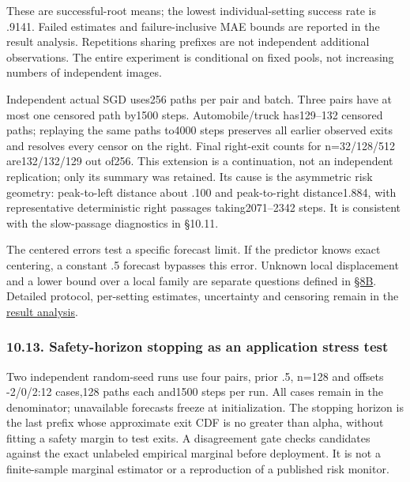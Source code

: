 These are successful-root means; the lowest individual-setting success
rate is .9141. Failed estimates and failure-inclusive MAE bounds are
reported in the result analysis. Repetitions sharing prefixes are not
independent additional observations. The entire experiment is
conditional on fixed pools, not increasing numbers of independent
images.

Independent actual SGD uses256 paths per pair and batch. Three pairs
have at most one censored path by1500 steps. Automobile/truck
has129--132 censored paths; replaying the same paths to4000 steps
preserves all earlier observed exits and resolves every censor on the
right. Final right-exit counts for n=32/128/512 are132/132/129 out
of256. This extension is a continuation, not an independent replication;
only its summary was retained. Its cause is the asymmetric risk
geometry: peak-to-left distance about .100 and peak-to-right
distance1.884, with representative deterministic right passages
taking2071--2342 steps. It is consistent with the slow-passage
diagnostics in §10.11.

The centered errors test a specific forecast limit. If the predictor
knows exact centering, a constant .5 forecast bypasses this error.
Unknown local displacement and a lower bound over a local family are
separate questions defined in \href{local_prediction.md}{§8B}. Detailed
protocol, per-setting estimates, uncertainty and censoring remain in the
\href{../experiments/results/centered_calibration/analysis.md}{result
analysis}.

\subsubsection{10.13. Safety-horizon stopping as an application stress
test}\label{experiments-safety-horizon-stopping-as-an-application-stress-test}

Two independent random-seed runs use four pairs, prior .5, n=128 and
offsets -2/0/2:12 cases,128 paths each and1500 steps per run. All cases
remain in the denominator; unavailable forecasts freeze at
initialization. The stopping horizon is the last prefix whose
approximate exit CDF is no greater than alpha, without fitting a safety
margin to test exits. A disagreement gate checks candidates against the
exact unlabeled empirical marginal before deployment. It is not a
finite-sample marginal estimator or a reproduction of a published risk
monitor.

